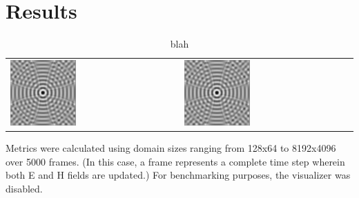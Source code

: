 \chapter{Results} \label{ch:conclusions}


\begin{table}
	\centering
	\label{tab:modelColorComponentUsage}
	\begin{tabular}{l | l}		
		\includegraphics[width=0.4\textwidth]{point-source-comparison-golightly.png} & \includegraphics[width=0.4\textwidth]{point-source-comparison-golightly.png}
	\end{tabular}
	\caption{blah}
\end{table}


Metrics were calculated using domain sizes ranging from 128x64 to 8192x4096 over 5000 frames. (In this case, a frame represents a complete time step wherein both E and H fields are updated.) For benchmarking purposes, the visualizer was disabled.


